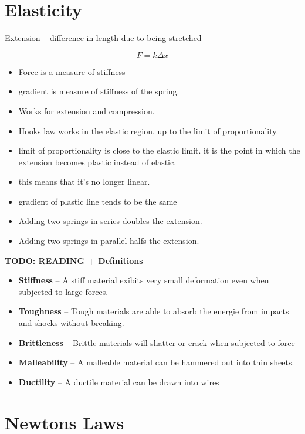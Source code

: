 \documentclass{article}
\begin{document}
\section{Elasticity}

Extension -- difference in length due to being stretched


\begin{equation}
	F = k\Delta x
\end{equation}

\begin{itemize}
	\item Force is a measure of stiffness
	\item gradient is measure of stiffness of the spring.
	\item Works for extension and compression.
	\item Hooks law works in the elastic region. up to the limit of proportionality.
	\item limit of proportionality is close to the elastic limit. it is the point in which the extension becomes plastic instead of elastic.
	\item this means that it's no longer linear.
	\item gradient of plastic line tends to be the same
	\item Adding two springs in series doubles the extension.
	\item Adding two springs in parallel halfs the extension.
\end{itemize}

\textbf{TODO: READING + Definitions}

\begin{itemize}
	\item \textbf{Stiffness} -- A stiff material exibits very small deformation even when subjected to large forces.
	\item \textbf{Toughness} -- Tough materials are able to absorb the energie from impacts and shocks without breaking.
	\item \textbf{Brittleness} -- Brittle materials will shatter or crack when subjected to force
	\item \textbf{Malleability} -- A malleable material can be hammered out into thin sheets.
	\item \textbf{Ductility} -- A ductile material can be drawn into wires
\end{itemize}


\section{Newtons Laws}
\end{document}

